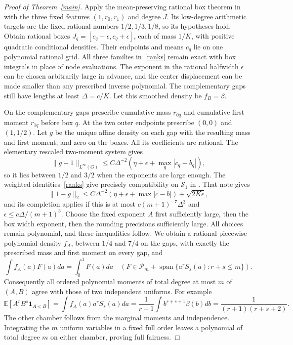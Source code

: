 \documentclass[11pt]{article}
\newcommand{\PP}{\mathcal P}
\begin{document}
\begin{proof}[Proof of Theorem~\ref{main}]
Apply the mean-preserving rational box theorem in
with the three fixed features $(1,r_0,r_1)$ and degree $J$.
Its low-degree arithmetic targets are the fixed rational numbers
$1/2,1/3,1/8$, so its hypotheses hold. Obtain rational boxes
$J_q=[c_q-\epsilon,c_q+\epsilon]$, each of mass $1/K$, with positive
quadratic conditional densities. Their endpoints and means $c_q$ lie
on one polynomial rational grid. All three families in~\eqref{ranks}
remain exact with box integrals in place of node evaluations.
The exponent in the rational halfwidth $\epsilon$ can be chosen
arbitrarily large in advance, and the center displacement can be made
smaller than any prescribed inverse polynomial. The complementary gaps
still have lengths at least $\Delta=c/K$.
Let this smoothed density be $f_B=\beta$.

On the complementary gaps prescribe cumulative mass $r_{0q}$ and
cumulative first moment $r_{1q}$ before box $q$. At the two outer
endpoints prescribe $(0,0)$ and $(1,1/2)$. Let $g$ be the unique affine
density on each gap with the resulting mass and first moment, and zero
on the boxes. All its coefficients are rational. The elementary
rescaled two-moment system gives
\[
 \|g-1\|_{L^\infty(G)}
 \le C\Delta^{-2}(\eta+\epsilon+\max_q|c_q-b_q|),
\]
so it lies between $1/2$ and $3/2$ when the exponents are large enough.
The weighted identities~\eqref{ranks} give precisely compatibility on
$\mathcal S_1$ in
. That note gives
\[
 \|1-g\|_2\le
 C\Delta^{-2}(\eta+\epsilon+\max|c-b|)+\sqrt{2K\epsilon},
\]
and its completion applies if this is at most
$c(m+1)^{-7}\Delta^3$ and $\epsilon\le c\Delta/(m+1)^3$.
Choose the fixed exponent $A$ first sufficiently large, then the box
width exponent, then the rounding precisions sufficiently large.
All choices remain polynomial, and these inequalities follow.
We obtain a rational piecewise polynomial density $f_A$, between
$1/4$ and $7/4$ on the gaps, with exactly the prescribed mass and first
moment on every gap, and
\[
 \int f_A(a)F(a)da=\int_0^1F(a)da
 \quad\left(F\in\PP_m+
       \operatorname{span}\{a^rS_s(a):r+s\le m\}\right).
\]
Consequently all ordered polynomial moments of total degree at most $m$
of $(A,B)$ agree with those of two independent uniforms. For example
\[
 \mathbb E[A^rB^s\mathbf1_{A<B}]
 =\int f_A(a)a^rS_s(a)da
 =\frac1{r+1}\int b^{r+s+1}\beta(b)db
 =\frac1{(r+1)(r+s+2)}.
\]
The other chamber follows from the marginal moments and independence.
Integrating the $m$ uniform variables in a fixed full order leaves a
polynomial of total degree $m$ on either chamber, proving full fairness.


\end{proof}
\end{document}
